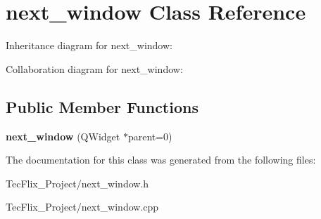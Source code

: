 \hypertarget{classnext__window}{}\section{next\+\_\+window Class Reference}
\label{classnext__window}


Inheritance diagram for next\+\_\+window\+:


Collaboration diagram for next\+\_\+window\+:
\subsection*{Public Member Functions}
\begin{DoxyCompactItemize}
\item 
\mbox{\label{classnext__window_a640bced71b79b8c3158d4cab54f3252b}} 
{\bfseries next\+\_\+window} (Q\+Widget $\ast$parent=0)
\end{DoxyCompactItemize}


The documentation for this class was generated from the following files\+:\begin{DoxyCompactItemize}
\item 
Tec\+Flix\+\_\+\+Project/next\+\_\+window.\+h\item 
Tec\+Flix\+\_\+\+Project/next\+\_\+window.\+cpp\end{DoxyCompactItemize}
